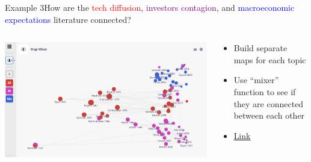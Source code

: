 \documentclass[aspectratio=43]{beamer}
\begin{document}
\begin{frame}{Example 3}{How are the \textcolor{red}{tech diffusion}, \textcolor{purple}{investors contagion}, and \textcolor{blue}{macroeconomic expectations} literature connected?}
    \begin{columns}[T]
    \vspace{0pt}
    \begin{column}{.60\textwidth}
        \includegraphics[width=\textwidth]{figures/Exam3.png}

        \vspace*{50mm} %
    \end{column}
    
    \hfill
    
    \begin{column}{.40\textwidth}
        \begin{itemize}
            \item Build separate maps for each topic
            \item Use ``mixer'' function to see if they are connected between each other
            \item  \href{https://app.litmaps.co/shared/0E6D51EB-462D-4F34-8BA2-27925D44DB8F}{Link}
        \end{itemize}
    \end{column}
    \end{columns}
\end{frame}
\end{document}
